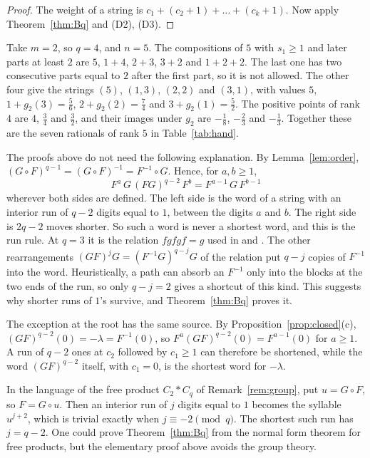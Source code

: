 \begin{proof}
The weight of a string is $c_1+(c_2+1)+\dots+(c_k+1)$. Now apply Theorem~\ref{thm:Bq} and (D2), (D3).
\end{proof}

\begin{example}
Take $m=2$, so $q=4$, and $n=5$. The compositions of $5$ with $s_1\ge1$ and later parts at least $2$
are $5$, $1+4$, $2+3$, $3+2$ and $1+2+2$. The last one has two consecutive parts equal to $2$ after
the first part, so it is not allowed. The other four give the strings $(5)$, $(1,3)$, $(2,2)$ and
$(3,1)$, with values $5$, $1+g_2(3)=\tfrac56$, $2+g_2(2)=\tfrac74$ and $3+g_2(1)=\tfrac52$. The positive
points of rank $4$ are $4$, $\tfrac34$ and $\tfrac32$, and their images under $g_2$ are $-\tfrac18$,
$-\tfrac23$ and $-\tfrac13$. Together these are the seven rationals of rank $5$ in
Table~\ref{tab:hand}.
\end{example}

\begin{remark}\label{rem:relation}
The proofs above do not need the following explanation. By Lemma~\ref{lem:order},
$(G\circ F)^{q-1}=(G\circ F)^{-1}=F^{-1}\circ G$. Hence, for $a,b\ge1$,
\[
F^{a}\,G\,(FG)^{q-2}\,F^{b}=F^{a-1}\,G\,F^{b-1}
\]
wherever both sides are defined. The left side is the word of a string with an interior run of
$q-2$ digits equal to $1$, between the digits $a$ and $b$. The right side is $2q-2$ moves shorter. So
such a word is never a shortest word, and this is the run rule. At $q=3$ it is the relation
$fgfgf=g$ used in \cite[Remark~3.9]{P137} and \cite{mmz}. The other rearrangements
$(GF)^jG=(F^{-1}G)^{q-j}G$ of the relation put $q-j$ copies of $F^{-1}$ into the word.
Heuristically, a path can absorb an $F^{-1}$ only into the blocks at the two ends of the run, so only
$q-j=2$ gives a shortcut of this kind. This suggests why shorter runs of $1$'s survive, and
Theorem~\ref{thm:Bq} proves it.

The exception at the root has the same source. By Proposition~\ref{prop:closed}(c),
$(GF)^{q-2}(0)=-\lambda=F^{-1}(0)$, so $F^{a}(GF)^{q-2}(0)=F^{a-1}(0)$ for $a\ge1$. A run of $q-2$ ones
at $c_2$ followed by $c_1\ge1$ can therefore be shortened, while the word $(GF)^{q-2}$ itself, with
$c_1=0$, is the shortest word for $-\lambda$.

In the language of the free product $C_2*C_q$ of Remark~\ref{rem:group}, put $u=G\circ F$, so $F=G\circ
u$. Then an interior run of $j$ digits equal to $1$ becomes the syllable $u^{j+2}$, which is trivial
exactly when $j\equiv-2\pmod q$. The shortest such run has $j=q-2$. One could prove
Theorem~\ref{thm:Bq} from the normal form theorem for free products, but the elementary proof above
avoids the group theory.
\end{remark}
